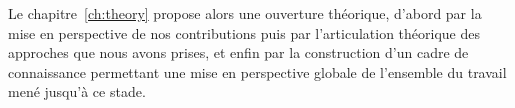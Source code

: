 Le chapitre~\ref{ch:theory} propose alors une ouverture théorique, d'abord par la mise en perspective de nos contributions puis par l'articulation théorique des approches que nous avons prises, et enfin par la construction d'un cadre de connaissance permettant une mise en perspective globale de l'ensemble du travail mené jusqu'à ce stade.



\stars

























